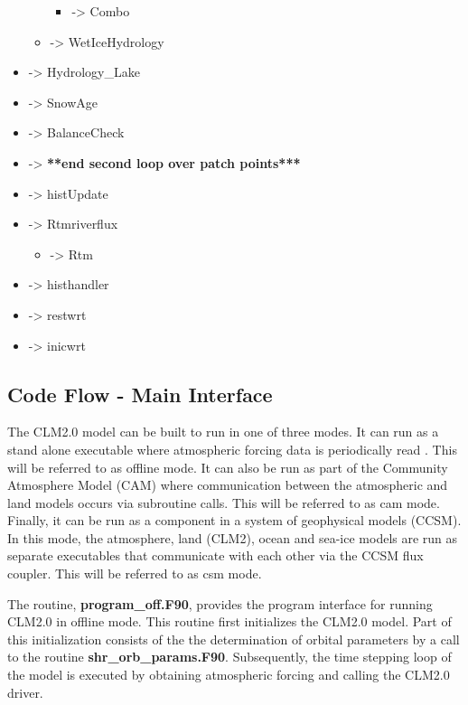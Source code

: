 \documentclass[]{article}
\begin{document}
\begin{itemize}
\begin{itemize}
     \begin{itemize}
     \item -> Combo 
     \end{itemize}
   \item -> WetIceHydrology 
   \end{itemize}
\item ->  Hydrology\_Lake 
\item ->  SnowAge 
\item ->  BalanceCheck 
\item -> {\bf ***end second loop over patch points***} 
\item ->  histUpdate 
\item ->  Rtmriverflux 
   \begin{itemize}
   \item ->  Rtm 
   \end{itemize}
\item ->  histhandler 
\item ->  restwrt 
\item ->  inicwrt 

\end{itemize}

\subsection {Code Flow - Main Interface}

The CLM2.0 model can be built to run in one of three modes. It can run
as a stand alone executable where atmospheric forcing data is
periodically read . This will be referred to as offline mode. It can
also be run as part of the Community Atmosphere Model (CAM) where
communication between the atmospheric and land models occurs via
subroutine calls. This will be referred to as cam mode. Finally, it
can be run as a component in a system of geophysical models (CCSM).
In this mode, the atmosphere, land (CLM2), ocean and sea-ice models
are run as separate executables that communicate with each other via
the CCSM flux coupler. This will be referred to as csm mode. \newline

 The routine, {\bf program\_off.F90},
provides the program interface for running CLM2.0 in offline
mode. This routine first initializes the CLM2.0 model. Part of this
initialization consists of the the determination of orbital parameters
by a call to the routine {\bf shr\_orb\_params.F90}.  Subsequently,
the time stepping loop of the model is executed by obtaining
atmospheric forcing and calling the CLM2.0 driver. \newline
\end{document}
